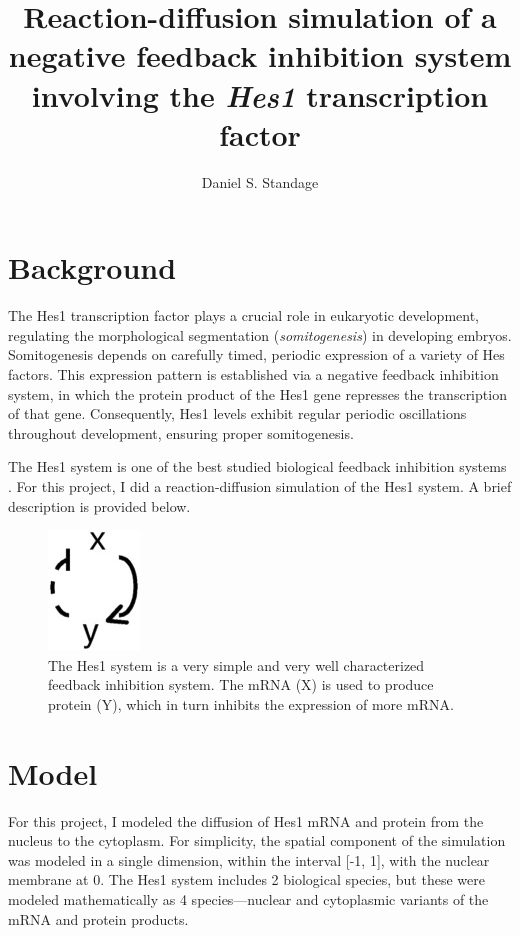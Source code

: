 \documentclass{bioinfo}
\begin{document}

\title[Hes1 reaction-diffusion]{Reaction-diffusion simulation of a negative feedback inhibition system involving the \textit{Hes1} transcription factor}
\author[Standage]{Daniel S. Standage}
\address{Department of Genetics, Development, and Cell Biology, Iowa State University, Ames, IA 50011}


\maketitle

\section*{Background}

The Hes1 transcription factor plays a crucial role in eukaryotic development, regulating the morphological segmentation (\textit{somitogenesis}) in developing embryos.
Somitogenesis depends on carefully timed, periodic expression of a variety of Hes factors.
This expression pattern is established via a negative feedback inhibition system, in which the protein product of the Hes1 gene represses the transcription of that gene.
Consequently, Hes1 levels exhibit regular periodic oscillations throughout development, ensuring proper somitogenesis.

The Hes1 system is one of the best studied biological feedback inhibition systems \citep{Sturrock}.
For this project, I did a reaction-diffusion simulation of the Hes1 system.
A brief description is provided below.

\begin{figure}[h]
  \begin{center}
    \includegraphics{../neg-fdbk-inh.jpg}
    \caption{The Hes1 system is a very simple and very well characterized feedback inhibition system. The mRNA (X) is used to produce protein (Y), which in turn inhibits the expression of more mRNA.}
  \end{center}
\end{figure}


\section*{Model}
For this project, I modeled the diffusion of Hes1 mRNA and protein from the nucleus to the cytoplasm.
For simplicity, the spatial component of the simulation was modeled in a single dimension, within the interval [-1, 1], with the nuclear membrane at 0.
The Hes1 system includes 2 biological species, but these were modeled mathematically as 4 species---nuclear and cytoplasmic variants of the mRNA and protein products.
\end{document}
